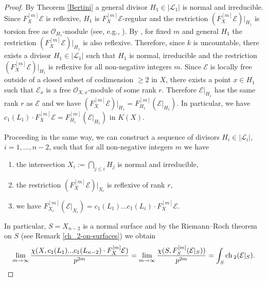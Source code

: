 \documentclass[twoside, 11pt]{article}
\theoremstyle{plain}
\theoremstyle{definition}
\theoremstyle{remark}
\newcommand{\cE}{{\mathcal E}}
\newcommand{\cL}{{\mathcal L}}
\newcommand{\cO}{{\mathcal O}}
\newcommand{\ch}{{\mathop{\rm ch \, }}}
\begin{document}
\begin{proof}
By Theorem \ref{Bertini} a general divisor  $H_1\in |\cL_1|$ is normal and irreducible. Since  $F_{X}^{[m]} \cE $ is  reflexive, $H_1$ is  $F_{X}^{[m]} \cE $-regular
and the restriction $(F_{X}^{[m]} \cE )|_{H_1}$ is torsion free as $\cO_{H_1}$-module (see, e.g., \cite[Lemma 1.1.13]{HL}). By \cite[Corollary 1.1.14]{HL}, for fixed $m$ and general $H_1$ the restriction $(F_{X}^{[m]} \cE )|_{H_1}$ is also reflexive. Therefore, since  $k$ is uncountable, there exists a divisor $H_1\in |\cL_1|$ 
such that $H_1$ is normal, irreducible and the restriction $(F_{X}^{[m]} \cE )|_{H_1}$ is reflexive for all non-negative integers $m$. Since $\cE $ is locally free outside of a closed subset of codimension $\ge 2$ in $X$, there exists a point $x\in H_1$ such that $\cE _x$ is a free $\cO_{X, x}$-module of some rank $r$. Therefore $\cE |_{H_1}$ has the same rank $r$ as $\cE $
and  we have $(F_{X}^{[m]} \cE )|_{H_1}=  F_{H_1}^{[m]} (\cE |_{H_1}).$ 
In particular, we have $c_1(L_1)\cdot F_{X}^{[m]} \cE= F_{H_1}^{[m]} (\cE |_{H_1})$ in $K(X)$.

Proceeding in the same way, we can construct a sequence of divisors $H_i\in  |\cL_i|$, $i=1,...,n-2$, such that for all  non-negative integers $m$ we have
\begin{enumerate}
\item the intersection  $X_i:=\bigcap _{j\le i} H_j $ is normal and irreducible,
\item the restriction $(F_{X}^{[m]} \cE )|_{X_i }$ is reflexive of rank $r$,
\item we have  $F_{X_i}^{[m]} (\cE |_{X_i })=
c_1(L_1)...c_1(L_i)\cdot F_{X}^{[m]} \cE.$
\end{enumerate}

 In particular,  $S=X_{n-2} $ is a normal surface and by   the Riemann--Roch theorem on $S$ (see Remark \ref{ch_2-on-surfaces}) we obtain
$$\lim _{m\to \infty }\frac {  \chi (X, c_1(L_1)...c_1(L_{n-2}) \cdot {F_X^{[m]}\cE}  ) }{p^{2m}}=\lim _{m\to \infty}\frac{\chi(S, F_{S}^{[m]} (\cE |_S )) }{p^{2m}}= \int _S \ch _2 (\cE |_S).$$
 \end{proof}

\medskip
\end{document}
